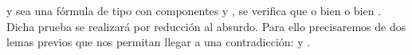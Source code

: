 \begin{isabellebody}
\begin{isamarkuptext}
  y sea  una fórmula de tipo \isa{{\isasymbeta}} con componentes  y , se verifica que o bien 
   o bien . Dicha prueba se realizará por reducción al absurdo. Para
  ello precisaremos de dos lemas previos que nos permitan llegar a una contradicción: 
   y .


\end{isamarkuptext}
\end{isabellebody}
